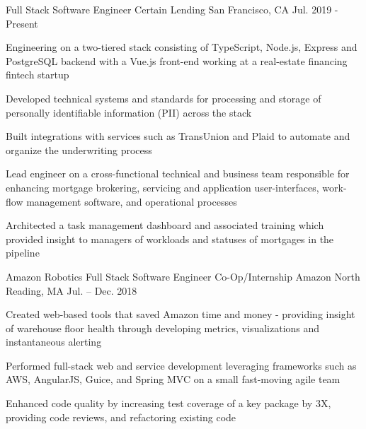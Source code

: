 

 




\begin{cventries}

  \cventry
     {Full Stack Software Engineer}
     {Certain Lending}
     {San Francisco, CA}
     {Jul. 2019 - Present}
     {
       \begin{cvitems}
			\item{Engineering on a two-tiered stack consisting of TypeScript, Node.js, Express and PostgreSQL backend with a Vue.js front-end working at a real-estate financing fintech startup}
			\item{Developed technical systems and standards for processing and storage of personally identifiable information (PII) across the stack}
			\item{Built integrations with services such as TransUnion and Plaid to automate and organize the underwriting process}
       		\item{Lead engineer on a cross-functional technical and business team responsible for enhancing mortgage brokering, servicing and application user-interfaces, work-flow management software, and operational processes}
       		\item{Architected a task management dashboard and associated training which provided insight to managers of workloads and statuses of mortgages in the pipeline}
       \end{cvitems}
     }
	 \cventry
    {Amazon Robotics Full Stack Software Engineer Co-Op/Internship} %
    {Amazon} %
    {North Reading, MA} %
    {Jul. – Dec. 2018} %
    {
    	\begin{cvitems} %
    		    \item {Created web-based tools that saved Amazon time and money - providing insight of warehouse floor health through developing metrics, visualizations and instantaneous alerting} 
    			\item {Performed full-stack web and service development leveraging frameworks such as AWS, AngularJS, Guice, and Spring MVC on a small fast-moving agile team} 
    			\item {Enhanced code quality by increasing test coverage of a key package by 3X, providing code reviews, and refactoring existing code}  			
    		 \end{cvitems}
    }


\end{cventries}
